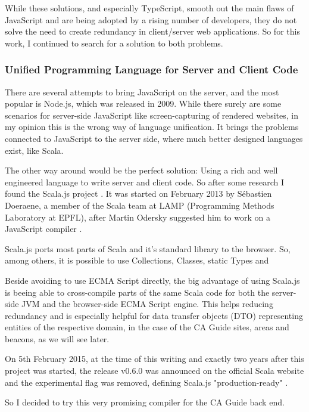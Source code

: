 While these solutions, and especially TypeScript, smooth out the main flaws of JavaScript and are being adopted by a rising number of developers, they do not solve the need to create redundancy in client/server web applications. So for this work, I continued to search for a solution to both problems.

\subsubsection{Unified Programming Language for Server and Client Code}

There are several attempts to bring JavaScript on the server, and the most popular is Node.js, which was released in 2009. While there surely are some scenarios for server-side JavaScript like screen-capturing of rendered websites, in my opinion this is the wrong way of language unification. It brings the problems connected to JavaScript to the server side, where much better designed languages exist, like Scala. 

The other way around would be the perfect solution: Using a rich and well engineered language to write server and client code. So after some research I found the Scala.js project \cite{scalajs}. It was started on February 2013 by Sébastien Doeraene, a member of the Scala team at LAMP (Programming Methods Laboratory at EPFL), after Martin Odersky suggested him to work on a JavaScript compiler \cite{scalajs-interview}.

Scala.js ports most parts of Scala and it's standard library to the browser. So, among others, it is possible to use Collections, Classes, static Types and 

Beside avoiding to use ECMA Script directly, the big advantage of using Scala.js is beeing able to cross-compile parts of the same Scala code for both the server-side JVM and the browser-side ECMA Script engine. This helps reducing redundancy and is especially helpful for data transfer objects (DTO) representing entities of the respective domain, in the case of the CA Guide sites, areas and beacons, as we will see later.

On 5th February 2015, at the time of this writing and exactly two years after this project was started, the release v0.6.0 was announced on the official Scala website and the experimental flag was removed, defining Scala.js "production-ready" \cite{scalajs06}.

So I decided to try this very promising compiler for the CA Guide back end.

